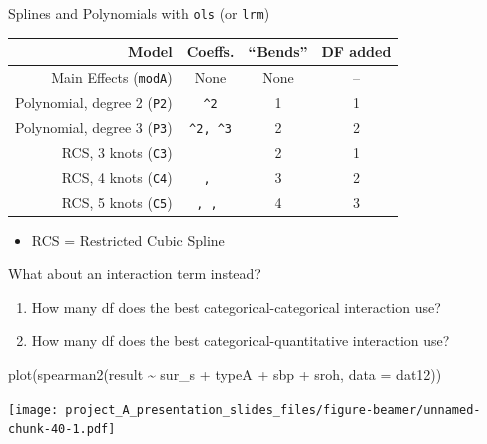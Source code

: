 \documentclass[
  ignorenonframetext,
]{beamer}
\newenvironment{Shaded}{\begin{snugshade}}{\end{snugshade}}
\newcommand{\AttributeTok}[1]{\textcolor[rgb]{0.77,0.63,0.00}{#1}}
\newcommand{\FunctionTok}[1]{\textcolor[rgb]{0.00,0.00,0.00}{#1}}
\newcommand{\NormalTok}[1]{#1}
\newcommand{\SpecialCharTok}[1]{\textcolor[rgb]{0.00,0.00,0.00}{#1}}
\providecommand{\tightlist}{%
  \setlength{\itemsep}{0pt}\setlength{\parskip}{0pt}}
\begin{document}
\begin{frame}[fragile]{Splines and Polynomials with \texttt{ols} (or
\texttt{lrm})}
\protect\hypertarget{splines-and-polynomials-with-ols-or-lrm}{}
\begin{longtable}[]{@{}rccc@{}}
\toprule
Model & Coeffs. & ``Bends'' & DF added \\
\midrule
\endhead
Main Effects (\texttt{modA}) & None & None & -- \\
Polynomial, degree 2 (\texttt{P2}) & \texttt{\^{}2} & 1 & 1 \\
Polynomial, degree 3 (\texttt{P3}) & \texttt{\^{}2,\ \^{}3} & 2 & 2 \\
RCS, 3 knots (\texttt{C3}) & \texttt{\textquotesingle{}} & 2 & 1 \\
RCS, 4 knots (\texttt{C4}) &
\texttt{\textquotesingle{},\ \textquotesingle{}\textquotesingle{}} & 3 &
2 \\
RCS, 5 knots (\texttt{C5}) &
\texttt{\textquotesingle{},\ \textquotesingle{}\textquotesingle{},\ \textquotesingle{}\textquotesingle{}\textquotesingle{}}
& 4 & 3 \\
\bottomrule
\end{longtable}

\begin{itemize}
\tightlist
\item
  RCS = Restricted Cubic Spline
\end{itemize}
\end{frame}

\begin{frame}[fragile]{What about an interaction term instead?}
\protect\hypertarget{what-about-an-interaction-term-instead}{}
\begin{enumerate}
\tightlist
\item
  How many df does the best categorical-categorical interaction use?
\item
  How many df does the best categorical-quantitative interaction use?
\end{enumerate}

\begin{Shaded}
\begin{Highlighting}[]
\FunctionTok{plot}\NormalTok{(}\FunctionTok{spearman2}\NormalTok{(result }\SpecialCharTok{\textasciitilde{}}\NormalTok{ sur\_s }\SpecialCharTok{+}\NormalTok{ typeA }\SpecialCharTok{+}\NormalTok{ sbp }\SpecialCharTok{+}\NormalTok{ sroh, }
               \AttributeTok{data =}\NormalTok{ dat12))}
\end{Highlighting}
\end{Shaded}

\texttt{[image: project\_A\_presentation\_slides\_files/figure-beamer/unnamed-chunk-40-1.pdf]}
\end{frame}
\end{document}
